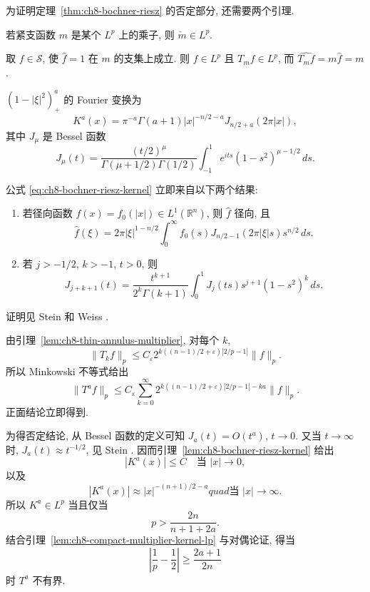 为证明定理~\ref{thm:ch8-bochner-riesz} 的否定部分, 还需要两个引理.

\begin{Lemma}
\label{lem:ch8-compact-multiplier-kernel-lp}
若紧支函数 $m$ 是某个 $L^p$ 上的乘子, 则 $\check m\in L^p$.
\end{Lemma}

\begin{Proof}
取 $f\in\mathcal S$, 使 $\widehat f=1$ 在 $m$ 的支集上成立. 则 $f\in L^p$ 且 $T_mf\in L^p$, 而 $\widehat{T_mf}=m\widehat f=m$.
\end{Proof}

\begin{Lemma}
\label{lem:ch8-bochner-riesz-kernel}
$(1-|\xi|^2)_+^a$ 的 Fourier 变换为
\begin{equation}
\label{eq:ch8-bochner-riesz-kernel}
 K^a(x)=\pi^{-a}\Gamma(a+1)|x|^{-n/2-a}J_{n/2+a}(2\pi|x|),
\end{equation}
其中 $J_\mu$ 是 Bessel 函数
\[
 J_\mu(t)=\frac{(t/2)^\mu}{\Gamma(\mu+1/2)\Gamma(1/2)}
 \int_{-1}^1e^{its}(1-s^2)^{\mu-1/2}\,ds.
\]
\end{Lemma}

\begin{Proof}
公式 \eqref{eq:ch8-bochner-riesz-kernel} 立即来自以下两个结果:
\begin{enumerate}[label=(\arabic*)]
\item 若径向函数 $f(x)=f_0(|x|)\in L^1(\mathbb R^n)$, 则 $\widehat f$ 径向, 且
\[
 \widehat f(\xi)=2\pi|\xi|^{1-n/2}
 \int_0^\infty f_0(s)J_{n/2-1}(2\pi|\xi|s)s^{n/2}\,ds.
\]
\item 若 $j>-1/2$, $k>-1$, $t>0$, 则
\[
 J_{j+k+1}(t)=\frac{t^{k+1}}{2^k\Gamma(k+1)}
 \int_0^1J_j(ts)s^{j+1}(1-s^2)^k\,ds.
\]
\end{enumerate}
证明见 Stein 和 Weiss .
\end{Proof}

\begin{Proof}
由引理~\ref{lem:ch8-thin-annulus-multiplier}, 对每个 $k$,
\[
 \|T_kf\|_p
 \le C_\varepsilon2^{k((n-1)/2+\varepsilon)|2/p-1|}\|f\|_p.
\]
所以 Minkowski 不等式给出
\[
 \|T^af\|_p
 \le C_\varepsilon\sum_{k=0}^\infty
 2^{k((n-1)/2+\varepsilon)|2/p-1|-ka}\|f\|_p.
\]
正面结论立即得到.

\hypertarget{chapter-08-page-184}{}
为得否定结论, 从 Bessel 函数的定义可知 $J_a(t)=O(t^a)$, $t\to0$. 又当 $t\to\infty$ 时, $J_a(t)\approx t^{-1/2}$, 见 Stein . 因而引理~\ref{lem:ch8-bochner-riesz-kernel} 给出
\[
 |K^a(x)|\le C\quad\text{当 }|x|\to0,
\]
以及
\[
 |K^a(x)|\approx|x|^{-(n+1)/2-a}quad\text{当 }|x|\to\infty.
\]
所以 $K^a\in L^p$ 当且仅当
\[
 p>\frac{2n}{n+1+2a}.
\]
结合引理~\ref{lem:ch8-compact-multiplier-kernel-lp} 与对偶论证, 得当
\[
 \left|\frac1p-\frac12\right|\ge\frac{2a+1}{2n}
\]
时 $T^a$ 不有界.
\end{Proof}

